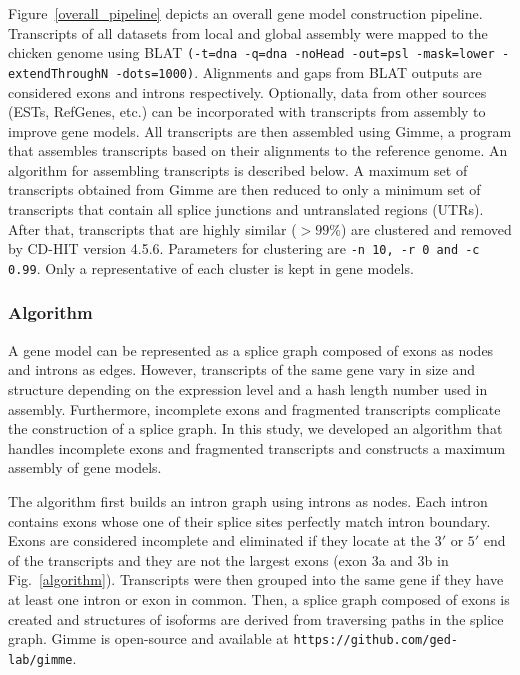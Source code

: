 \documentclass[10pt]{article}
\begin{document}
Figure~\ref{overall_pipeline} depicts an overall gene model construction pipeline.
Transcripts of all datasets from local and global assembly were mapped to the chicken genome using
BLAT\cite{Kent:2002tv} \texttt{(-t=dna -q=dna -noHead -out=psl -mask=lower -extendThroughN -dots=1000)}.
Alignments and gaps from BLAT outputs are considered exons and introns respectively.
Optionally, data from other sources (ESTs, RefGenes, etc.) can be incorporated with transcripts from assembly to improve gene models.
All transcripts are then assembled using Gimme, a program that assembles transcripts based on their alignments to the reference genome.
An algorithm for assembling transcripts is described below.
A maximum set of transcripts obtained from Gimme are then reduced to only a minimum set of transcripts that contain
all splice junctions and untranslated regions (UTRs).
After that, transcripts that are highly similar ($>99\%$) are clustered and removed by CD-HIT version 4.5.6\cite{Li:2006hr}.
Parameters for clustering are \texttt{-n 10, -r 0 and -c 0.99}.
Only a representative of each cluster is kept in gene models.

\subsubsection*{Algorithm}

A gene model can be represented as a splice graph composed of exons as nodes and introns as edges.
However, transcripts of the same gene vary in size and structure depending on the expression level and a hash length number used in assembly.
Furthermore, incomplete exons and fragmented transcripts complicate the construction of a splice graph.
In this study, we developed an algorithm that handles incomplete exons and fragmented transcripts and constructs a maximum assembly of gene models.

The algorithm first builds an intron graph using introns as nodes.
Each intron contains exons whose one of their splice sites perfectly match intron boundary.
Exons are considered incomplete and eliminated if they locate at the $3'$ or $5'$ end of the transcripts and
they are not the largest exons (exon 3a and 3b in Fig.~\ref{algorithm}).
Transcripts were then grouped into the same gene if they have at least one intron or exon in common.
Then, a splice graph composed of exons is created and structures of isoforms are derived from traversing paths in the splice graph.
Gimme is open-source and available at \texttt{https://github.com/ged-lab/gimme}.
\end{document}
